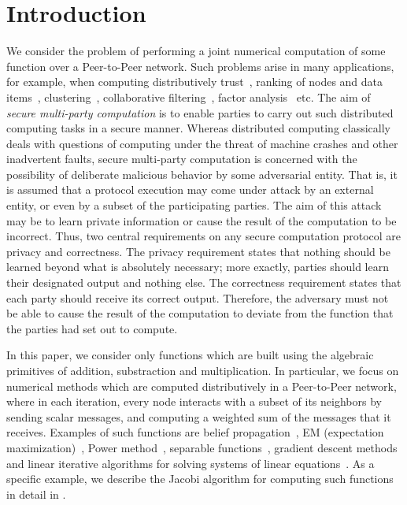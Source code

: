 \documentclass[10pt]{svjour3}
\begin{document}
\section{Introduction}
We consider the problem of performing a joint numerical
computation of some function over a Peer-to-Peer network. Such
problems arise in many applications, for example, when computing
distributively trust~\cite{EigenTrust}, ranking of nodes and data
items~\cite{p2p-rating}, clustering~\cite{EWSN08}, collaborative
filtering~\cite{KorenCF,PP2}, factor analysis~\cite{Canny} etc.
The aim of {\em secure multi-party computation} is to enable
parties to carry out such distributed computing tasks in a secure
manner. Whereas distributed computing classically deals with
questions of computing under the threat of machine crashes and
other inadvertent faults, secure multi-party computation is
concerned with the possibility of deliberate malicious behavior by
some adversarial entity. That is, it is assumed that a protocol
execution may come under attack by an external entity, or even by
a subset of the participating parties. The aim of this attack may
be to learn private information or cause the result of the
computation to be incorrect. Thus, two central requirements on any
secure computation protocol are privacy and correctness. The
privacy requirement states that nothing should be learned beyond
what is absolutely necessary; more exactly, parties should learn
their designated output and nothing else. The correctness
requirement states that each party should receive its correct
output. Therefore, the adversary must not be able to cause the
result of the computation to deviate from the function that the
parties had set out to compute.

In this paper, we consider only functions which are built using the
algebraic primitives of addition, substraction and multiplication. In
particular, we focus on numerical methods which are computed
distributively in a Peer-to-Peer network, where in each iteration,
every node interacts with a subset of its neighbors by sending scalar
messages, and computing a weighted sum of the messages that it
receives. Examples of such functions are belief
propagation~\cite{BibDB:BookPearl}, EM (expectation
maximization)~\cite{Canny}, Power method~\cite{EigenTrust}, separable
functions~\cite{Separable}, gradient descent methods~\cite{PP3} and
linear iterative algorithms for solving systems of linear
equations~\cite{BibDB:BookBertsekasTsitsiklis}.  As a specific
example, we describe the Jacobi algorithm for computing such functions
in detail in .
\end{document}
